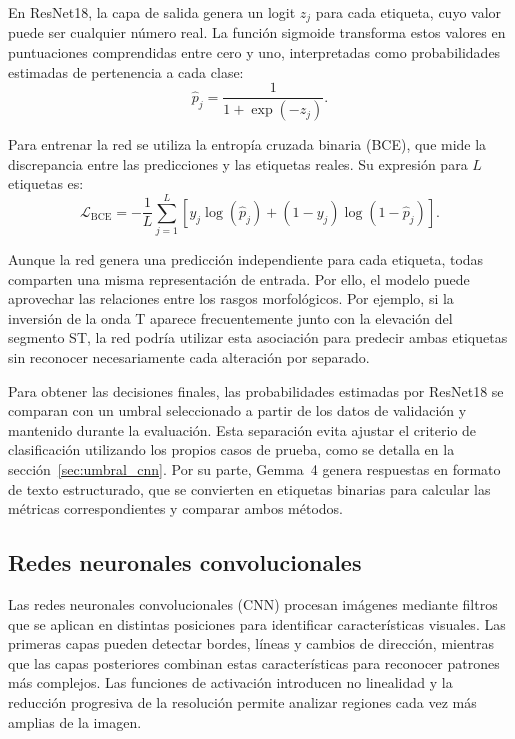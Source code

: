 En ResNet18, la capa de salida genera un logit \(z_j\) para cada etiqueta, cuyo valor puede ser cualquier número real. La función sigmoide transforma estos valores en puntuaciones comprendidas entre cero y uno, interpretadas como probabilidades estimadas de pertenencia a cada clase:
\begin{equation}
\hat{p}_j=\frac{1}{1+\exp(-z_j)}.
\end{equation}

Para entrenar la red se utiliza la entropía cruzada binaria (BCE), que mide la discrepancia entre las predicciones y las etiquetas reales. Su expresión para \(L\) etiquetas es:
\begin{equation}
\mathcal{L}_{\mathrm{BCE}}=
-\frac{1}{L}\sum_{j=1}^{L}
\left[y_j\log(\hat{p}_j)+(1-y_j)\log(1-\hat{p}_j)\right].
\label{eq:bce}
\end{equation}

Aunque la red genera una predicción independiente para cada etiqueta, todas comparten una misma representación de entrada. Por ello, el modelo puede aprovechar las relaciones entre los rasgos morfológicos. Por ejemplo, si la inversión de la onda T aparece frecuentemente junto con la elevación del segmento ST, la red podría utilizar esta asociación para predecir ambas etiquetas sin reconocer necesariamente cada alteración por separado.

Para obtener las decisiones finales, las probabilidades estimadas por ResNet18 se comparan con un umbral seleccionado a partir de los datos de validación y mantenido durante la evaluación. Esta separación evita ajustar el criterio de clasificación utilizando los propios casos de prueba, como se detalla en la sección~\ref{sec:umbral_cnn}. Por su parte, Gemma~4 genera respuestas en formato de texto estructurado, que se convierten en etiquetas binarias para calcular las métricas correspondientes y comparar ambos métodos.

\subsection{Redes neuronales convolucionales}
\label{sec:fundamentos_cnn}

Las redes neuronales convolucionales (CNN) procesan imágenes mediante filtros que se aplican en distintas posiciones para identificar características visuales. Las primeras capas pueden detectar bordes, líneas y cambios de dirección, mientras que las capas posteriores combinan estas características para reconocer patrones más complejos. Las funciones de activación introducen no linealidad y la reducción progresiva de la resolución permite analizar regiones cada vez más amplias de la imagen.

